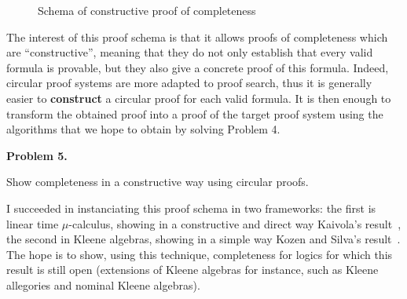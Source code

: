 \documentclass[11pt,twocolumn]{article}
\begin{document}
\begin{figure*}
  \begin{flushleft}
\end{flushleft}
\caption{Schema of constructive proof of completeness  \label{ConstructiveCompleteness}}
\end{figure*}

The interest of this proof schema is that it allows proofs of completeness which are ``constructive'', meaning that they do not only establish that every valid formula is provable, but they also give a concrete proof of this formula. Indeed, circular proof systems are more adapted to proof search, thus it is generally easier to  \textbf{construct}
a circular proof for each valid formula. It is then enough to transform the obtained proof into a proof of the target proof system using the algorithms that we hope to obtain by solving Problem 4.
  

\begin{center}
\begin{bclogo}[logo= ,arrondi = 0.1, couleur = green!10,  epBarre = 0]{}
  \vspace{-10pt}
  \textbf{Problem 5.}

Show completeness in a constructive way using circular proofs. 
\end{bclogo}
\end{center}

I succeeded in instanciating this proof schema in two  frameworks: the first is  linear time $\mu$-calculus, showing in a constructive and direct way Kaivola's result~\cite{}, the second in Kleene algebras, showing in a simple way Kozen and Silva's result~\cite{}. The hope is to show, using this technique, completeness for logics for which this result is still open (extensions of Kleene algebras for instance, such as Kleene allegories and nominal Kleene
algebras).   
  
\end{document}
